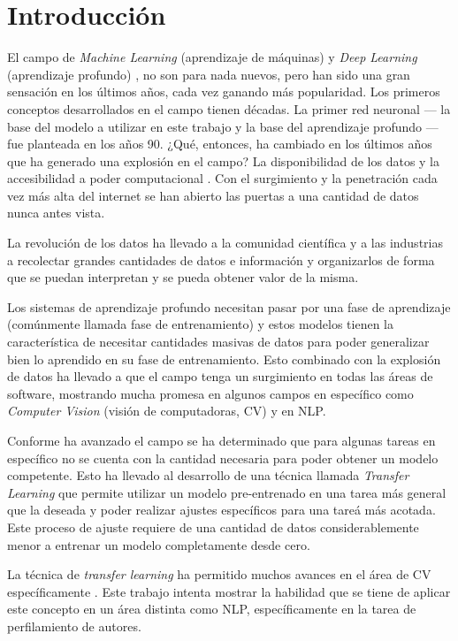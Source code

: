 
\section{Introducción}

El campo de \emph{Machine Learning} (aprendizaje de máquinas) y \emph{Deep Learning} (aprendizaje profundo) \parencite{lecun2015deep}, no son para nada nuevos, pero han sido una gran sensación en los últimos años, cada vez ganando más popularidad. Los primeros conceptos desarrollados en el campo tienen décadas. La primer red neuronal --- la base del modelo a utilizar en este trabajo y la base del aprendizaje profundo --- fue planteada en los años 90. ¿Qué, entonces, ha cambiado en los últimos años que ha generado una explosión en el campo? La disponibilidad de los datos y la accesibilidad a poder computacional \parencite{jordan2015machine}. Con el surgimiento y la penetración cada vez más alta del internet se han abierto las puertas a una cantidad de datos nunca antes vista.

La revolución de los datos ha llevado a la comunidad científica y a las industrias a recolectar grandes cantidades de datos e información y organizarlos de forma que se puedan interpretan y se pueda obtener valor de la misma.

Los sistemas de aprendizaje profundo necesitan pasar por una fase de aprendizaje (comúnmente llamada fase de entrenamiento) y estos modelos tienen la característica de necesitar cantidades masivas de datos para poder generalizar bien lo aprendido en su fase de entrenamiento. Esto combinado con la explosión de datos ha llevado a que el campo tenga un surgimiento en todas las áreas de software, mostrando mucha promesa en algunos campos en específico como \emph{Computer Vision} (visión de computadoras, CV) \parencite{hoo2016deep} y en NLP.

Conforme ha avanzado el campo se ha determinado que para algunas tareas en específico no se cuenta con la cantidad necesaria para poder obtener un modelo competente. Esto ha llevado al desarrollo de una técnica llamada \emph{Transfer Learning} que permite utilizar un modelo pre-entrenado en una tarea más general que la deseada y poder realizar ajustes específicos para una tareá más acotada. Este proceso de ajuste requiere de una cantidad de datos considerablemente menor a entrenar un modelo completamente desde cero.

La técnica de \emph{transfer learning} ha permitido muchos avances en el área de CV específicamente \parencite{hoo2016deep}. Este trabajo intenta mostrar la habilidad que se tiene de aplicar este concepto en un área distinta como NLP, específicamente en la tarea de perfilamiento de autores.

